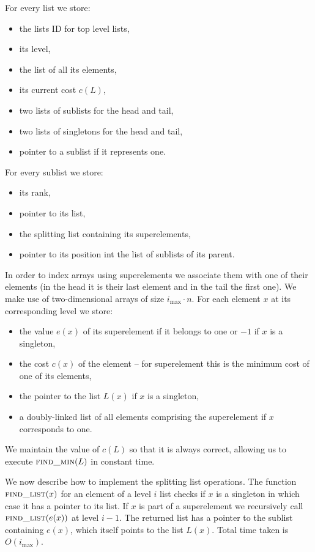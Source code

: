 For every list we store:

\begin{itemize}
    \item the lists ID for top level lists,
    \item its level,
    \item the list of all its elements,
    \item its current cost $c(L)$,
    \item two lists of sublists for the head and tail,
    \item two lists of singletons for the head and tail,
    \item pointer to a sublist if it represents one.
\end{itemize}

For every sublist we store:

\begin{itemize}
    \item its rank,
    \item pointer to its list,
    \item the splitting list containing its superelements,
    \item pointer to its position int the list of sublists of its parent.
\end{itemize}

In order to index arrays using superelements we associate them with one of their elements (in the head it is their last element and in the tail the first one). We make use of two-dimensional arrays of size $i_{\max} \cdot n$. For each element $x$ at its corresponding level we store:

\begin{itemize}
    \item the value $e(x)$ of its superelement if it belongs to one or $-1$ if $x$ is a singleton,
    \item the cost $c(x)$ of the element – for superelement this is the minimum cost of one of its elements,
    \item the pointer to the list $L(x)$ if $x$ is a singleton,
    \item a doubly-linked list of all elements comprising the superelement if $x$ corresponds to one.
\end{itemize}

We maintain the value of $c(L)$ so that it is always correct, allowing us to execute $\textsc{find\_min}(L)$ in constant time.

We now describe how to implement the splitting list operations. The function $\textsc{find\_list}(x)$ for an element of a level $i$ list checks if $x$ is a singleton in which case it has a pointer to its list. If $x$ is part of a superelement we recursively call $\textsc{find\_list}(e(x))$ at level $i-1$. The returned list has a pointer to the sublist containing $e(x)$, which itself points to the list $L(x)$. Total time taken is $O(i_{\max})$.

